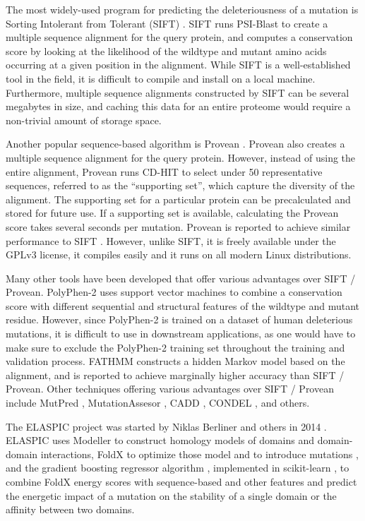 The most widely-used program for predicting the deleteriousness of a mutation is Sorting Intolerant from Tolerant (SIFT) \cite{ng_sift:_2003}. SIFT runs PSI-Blast to create a multiple sequence alignment for the query protein, and computes a conservation score by looking at the likelihood of the wildtype and mutant amino acids occurring at a given position in the alignment. While SIFT is a well-established tool in the field, it is difficult to compile and install on a local machine. Furthermore, multiple sequence alignments constructed by SIFT can be several megabytes in size, and caching this data for an entire proteome would require a non-trivial amount of storage space.

Another popular sequence-based algorithm is Provean \cite{choi_predicting_2012}. Provean also creates a multiple sequence alignment for the query protein. However, instead of using the entire alignment, Provean runs CD-HIT to select under 50 representative sequences, referred to as the ``supporting set'', which capture the diversity of the alignment. The supporting set for a particular protein can be precalculated and stored for future use. If a supporting set is available, calculating the Provean score takes several seconds per mutation. Provean is reported to achieve similar performance to SIFT \cite{choi_predicting_2012}. However, unlike SIFT, it is freely available under the GPLv3 license, it compiles easily and it runs on all modern Linux distributions.

Many other tools have been developed that offer various advantages over SIFT / Provean. PolyPhen-2 \cite{adzhubei_predicting_2001} uses support vector machines to combine a conservation score with different sequential and structural features of the wildtype and mutant residue. However, since PolyPhen-2 is trained on a dataset of human deleterious mutations, it is difficult to use in downstream applications, as one would have to make sure to exclude the PolyPhen-2 training set throughout the training and validation process. FATHMM \cite{shihab_ranking_2014} constructs a hidden Markov model based on the alignment, and is reported to achieve marginally higher accuracy than SIFT / Provean. Other techniques offering various advantages over SIFT / Provean include MutPred \cite{li_automated_2009}, MutationAssesor \cite{network_integrated_2011}, CADD \cite{kircher_general_2014}, CONDEL \cite{gonzalez-perez_improving_2011}, and others.






The ELASPIC project was started by Niklas Berliner and others in 2014 \cite{berliner_combining_2014}. ELASPIC uses Modeller \cite{webb_comparative_2002} to construct homology models of domains and domain-domain interactions, FoldX to optimize those model and to introduce mutations \cite{schymkowitz_foldx_2005}, and the gradient boosting regressor algorithm \cite{berliner_combining_2014}, implemented in scikit-learn \cite{scikit-learn}, to combine FoldX energy scores with sequence-based and other features and predict the energetic impact of a mutation on the stability of a single domain or the affinity between two domains.

